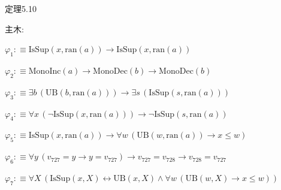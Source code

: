 \begin{fullproof}{定理5.10}
\begin{ptree}
\noLine
{}
\end{ptree}
\noindent 主木:
\begin{ptree}
\noLine
{}
\end{ptree}
\begin{abbrevlist}
\item $\varphi_{1} :\equiv \mathrm{IsSup}(x,\mathrm{ran}(a)) \to \mathrm{IsSup}(x,\mathrm{ran}(a))$
\item $\varphi_{2} :\equiv \mathrm{MonoInc}(a) \to \mathrm{MonoDec}(b) \to \mathrm{MonoDec}(b)$
\item $\varphi_{3} :\equiv \exists b\,(\mathrm{UB}(b,\mathrm{ran}(a))) \to \exists s\,(\mathrm{IsSup}(s,\mathrm{ran}(a)))$
\item $\varphi_{4} :\equiv \forall x\,(\neg \mathrm{IsSup}(x,\mathrm{ran}(a))) \to \neg \mathrm{IsSup}(s,\mathrm{ran}(a))$
\item $\varphi_{5} :\equiv \mathrm{IsSup}(x,\mathrm{ran}(a)) \to \forall w\,(\mathrm{UB}(w,\mathrm{ran}(a)) \to x \leq w)$
\item $\varphi_{6} :\equiv \forall y\,(v_{727} = y \to y = v_{727}) \to v_{727} = v_{728} \to v_{728} = v_{727}$
\item $\varphi_{7} :\equiv \forall X\,(\mathrm{IsSup}(x,X) \leftrightarrow \mathrm{UB}(x,X) \land \forall w\,(\mathrm{UB}(w,X) \to x \leq w))$

\end{abbrevlist}
\end{fullproof}

